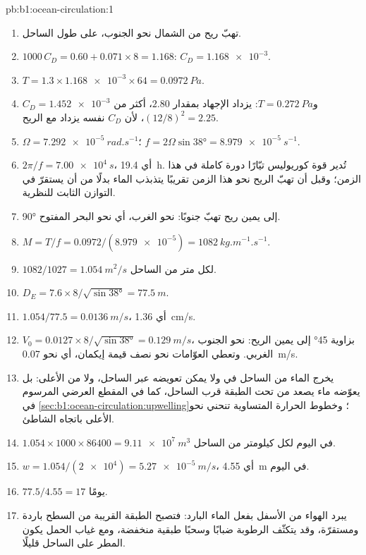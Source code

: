 \begin{solution}{pb:b1:ocean-circulation:1}
\begin{enumerate}
  \item تهبّ ريح من الشمال نحو الجنوب، على طول الساحل.
  \item $1000\,C_D = 0.60 + 0.071 \times 8 = 1.168$: $C_D = \num{1.168e-3}$.
  \item $T = 1.3 \times \num{1.168e-3} \times 64 = \qty{0.0972}{Pa}$.
  \item $C_D = \num{1.452e-3}$ و$T = \qty{0.272}{Pa}$: يزداد الإجهاد بمقدار $2.80$، أكثر من $(12/8)^2 = 2.25$، لأن $C_D$ نفسه يزداد مع الريح.
  \item $\Omega = \qty{7.292e-5}{rad.s^{-1}}$؛ $f = 2\Omega\sin\ang{38} =
        \qty{8.979e-5}{s^{-1}}$.
  \item $2\pi/f = \qty{7.00e4}{s}$، أي \qty{19.4}{h}. تُدير قوة كوريوليس تيّارًا دورة كاملة في هذا الزمن؛ وقبل أن تهبّ الريح نحو هذا الزمن تقريبًا يتذبذب الماء بدلًا من أن يستقرّ في التوازن الثابت للنظرية.
  \item \ang{90} إلى يمين ريح تهبّ جنوبًا: نحو الغرب، أي نحو البحر المفتوح.
  \item $M = T/f = 0.0972/(\num{8.979e-5}) = \qty{1082}{kg.m^{-1}.s^{-1}}$.
  \item $1082/1027 = \qty{1.054}{m^2/s}$ لكل متر من الساحل.
  \item $D_E = 7.6 \times 8/\sqrt{\sin\ang{38}} = \qty{77.5}{m}$.
  \item $1.054/77.5 = \qty{0.0136}{m/s}$، أي \qty{1.36}{cm/s}.
  \item $V_0 = 0.0127 \times 8/\sqrt{\sin\ang{38}} = \qty{0.129}{m/s}$، بزاوية \ang{45} إلى يمين الريح: نحو الجنوب الغربي. وتعطي العوّامات نحو نصف قيمة إيكمان، أي نحو \qty{0.07}{m/s}.
  \item يخرج الماء من الساحل في  ولا يمكن تعويضه عبر الساحل، ولا من الأعلى: بل يعوّضه ماء يصعد من تحت الطبقة قرب الساحل، كما في المقطع العرضي المرسوم في \cref{sec:b1:ocean-circulation:upwelling}؛ وخطوط الحرارة المتساوية تنحني نحو الأعلى باتجاه الشاطئ.
  \item $1.054 \times 1000 \times 86400 = \qty{9.11e7}{m^3}$ في اليوم لكل كيلومتر من الساحل.
  \item $w = 1.054/(\num{2e4}) = \qty{5.27e-5}{m/s}$، أي \qty{4.55}{m} في اليوم.
  \item $77.5/4.55 = 17$ يومًا.
  \item يبرد الهواء من الأسفل بفعل الماء البارد: فتصبح الطبقة القريبة من السطح باردة ومستقرّة، وقد يتكثّف الرطوبة ضبابًا وسحبًا طبقية منخفضة، ومع غياب الحمل يكون المطر على الساحل قليلًا.

\end{enumerate}
\end{solution}
